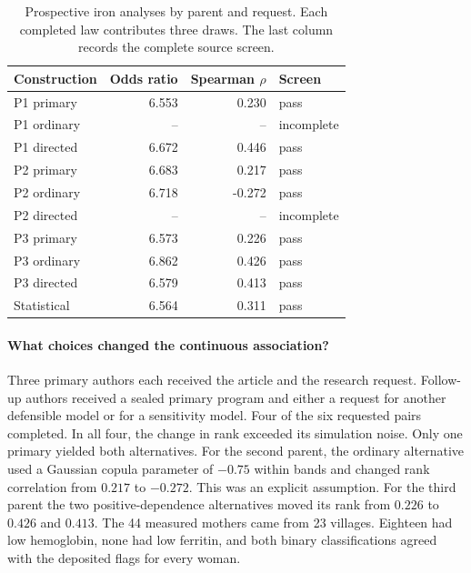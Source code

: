 \begin{table}[H]
\caption{Prospective iron analyses by parent and request. Each completed law contributes three draws. The last column records the complete source screen.}
\label{tab:ironprospective}
\centering
\begin{tabular}{@{}lrrl@{}}
\toprule
Construction & Odds ratio & Spearman $\rho$ & Screen\\
\midrule
P1 primary & 6.553 & 0.230 & pass\\
P1 ordinary & -- & -- & incomplete\\
P1 directed & 6.672 & 0.446 & pass\\
P2 primary & 6.683 & 0.217 & pass\\
P2 ordinary & 6.718 & -0.272 & pass\\
P2 directed & -- & -- & incomplete\\
P3 primary & 6.573 & 0.226 & pass\\
P3 ordinary & 6.862 & 0.426 & pass\\
P3 directed & 6.579 & 0.413 & pass\\
Statistical & 6.564 & 0.311 & pass\\
\bottomrule
\end{tabular}
\end{table}

\paragraph{What choices changed the continuous association?}
Three primary authors each received the article and the research request. Follow-up authors received a sealed primary program and either a request for another defensible model or for a sensitivity model. Four of the six requested pairs completed. In all four, the change in rank exceeded its simulation noise. Only one primary yielded both alternatives. For the second parent, the ordinary alternative used a Gaussian copula parameter of $-0.75$ within bands and changed rank correlation from $0.217$ to $-0.272$. This was an explicit assumption. For the third parent the two positive-dependence alternatives moved its rank from $0.226$ to $0.426$ and $0.413$. The 44 measured mothers came from 23 villages. Eighteen had low hemoglobin, none had low ferritin, and both binary classifications agreed with the deposited flags for every woman.

